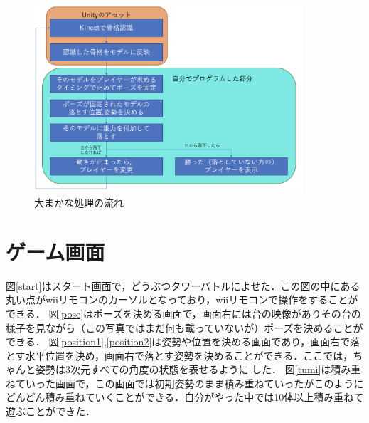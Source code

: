 \documentclass[uplatex,titlepage]{jsarticle}
\begin{document}
\begin{figure}
\begin{center}
   \includegraphics[width=10.0cm]{images/hyou.png}
 \caption{大まかな処理の流れ}
 \label{hyou}
 \end{center}
\end{figure}

\section{ゲーム画面}
図\ref{start}はスタート画面で，どうぶつタワーバトルによせた．この図の中にある丸い点がwiiリモコンのカーソルとなっており，wiiリモコンで操作をすることができる．
図\ref{pose}はポーズを決める画面で，画面右には台の映像がありその台の様子を見ながら（この写真ではまだ何も載っていないが）ポーズを決めることができる．
図\ref{position1},\ref{position2}は姿勢や位置を決める画面であり，画面右で落とす水平位置を決め，画面右で落とす姿勢を決めることができる．ここでは，ちゃんと姿勢は3次元すべての角度の状態を表せるように
した．
図\ref{tumi}は積み重ねていった画面で，この画面では初期姿勢のまま積み重ねていったがこのようにどんどん積み重ねていくことができる．自分がやった中では10体以上積み重ねて遊ぶことができた．
\end{document}
